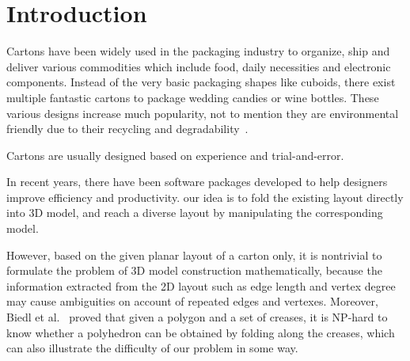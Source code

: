 \section{Introduction}

Cartons have been widely used in the packaging industry to organize, ship and deliver various commodities which include food, daily necessities and electronic components. Instead of the very basic packaging shapes like cuboids, there exist multiple fantastic cartons to package wedding candies or wine bottles. 
These various designs increase much popularity, not to mention they are environmental friendly due to their recycling and degradability~\cite{Mullineux:2010:CSC:1739328.1739673}.

Cartons are usually designed based on experience and trial-and-error.

In recent years, there have been software packages developed to help designers improve efficiency and productivity.
 our idea is to fold the existing layout directly into 3D model, and reach a diverse layout by manipulating the corresponding model.

However, based on the given planar layout of a carton only, it is nontrivial to formulate the problem of 3D model construction mathematically, because the information extracted from the 2D layout such as edge length and vertex degree may cause ambiguities on account of repeated edges and vertexes. Moreover, Biedl et al.~\cite{Biedl:2005:NFP:1090462.1646553} proved that given a polygon and a set of creases, it is NP-hard to know whether a polyhedron can be obtained by folding along the creases, which can also illustrate the difficulty of our problem in some way.

